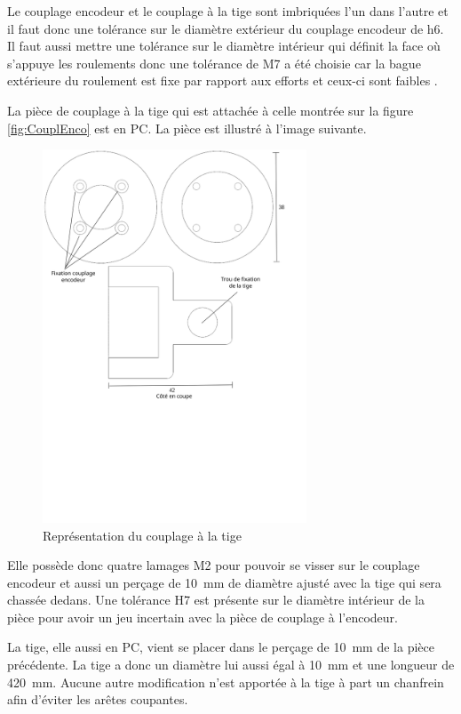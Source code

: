 Le couplage encodeur et le couplage à la tige sont imbriquées l'un dans l'autre et il faut donc une tolérance sur le diamètre extérieur du couplage encodeur de h6. Il faut aussi mettre une tolérance
sur le diamètre intérieur qui définit la face où s'appuye les roulements donc une tolérance de M7 a été choisie car la bague extérieure du
roulement est fixe par rapport aux efforts et ceux-ci sont faibles \cite{Ajustements}.

La pièce de couplage à la tige qui est attachée à celle montrée sur la figure \ref{fig:CouplEnco} est en \acrshort{PC}. La pièce est illustré à
l'image suivante.

\begin{figure}[H]
    \centering
    \includegraphics[width = 0.7\textwidth]{assets/figures/CouplageTige.svg}
    \caption{Représentation du couplage à la tige}
    \label{fig:CouplTige}
\end{figure}

Elle possède donc quatre lamages M2 pour pouvoir se visser sur le couplage encodeur et aussi un perçage de 10~mm de diamètre ajusté avec la tige
qui sera chassée dedans. Une tolérance H7 est présente sur le diamètre intérieur de la pièce pour avoir un jeu incertain avec la pièce de
couplage à l'encodeur.

La tige, elle aussi en \acrshort{PC}, vient se placer dans le perçage de 10~mm de la pièce précédente. La tige a donc un
diamètre lui aussi égal à 10~mm et une longueur de 420~mm. Aucune autre modification n'est apportée à la tige à part un chanfrein afin d'éviter
les arêtes coupantes.\\

